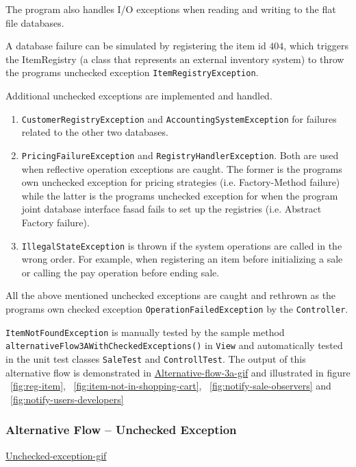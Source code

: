 \documentclass[a4paper]{scrreprt}
\begin{document}
The program also handles I/O exceptions when reading and writing to the flat file databases.

A database failure can be simulated by registering the item id $404$,
which triggers the ItemRegistry (a class that represents an external inventory system)
to throw the programs unchecked exception \texttt{ItemRegistryException}.

Additional unchecked exceptions are implemented and handled.
\begin{enumerate}
    \item \texttt{CustomerRegistryException} and \texttt{AccountingSystemException} for
    failures related to the other two databases.
    \item \texttt{PricingFailureException} and \texttt{RegistryHandlerException}.
    Both are used when reflective operation exceptions are caught.
    The former is the programs own unchecked exception for pricing strategies
    (i.e. Factory-Method failure) while the latter
    is the programs unchecked exception for
    when the program joint database interface fasad fails to set up the registries
    (i.e. Abstract Factory failure).
    \item \texttt{IllegalStateException} is thrown if the
    system operations are called in the wrong order.
    For example, when registering an item before initializing a sale
    or calling the pay operation before ending sale.
\end{enumerate}

All the above mentioned unchecked exceptions %
are caught and rethrown as the programs own checked
exception \texttt{OperationFailedException}
by the \verb|Controller|.

\texttt{ItemNotFoundException} is manually tested by the sample method
\texttt{alternativeFlow3AWithCheckedExceptions()}
in \verb|View|
and automatically tested in the unit test classes \verb|SaleTest| and \verb|ControllTest|.
The output of this alternative flow is demonstrated in
\href{https://github.com/VincentFerrigan/kth-iv1350-object-oriented-design#alternative-flow---checked-exception-business-logic}{Alternative-flow-3a-gif}
and illustrated in
figure ~\ref{fig:reg-item}, ~\ref{fig:item-not-in-shopping-cart}, ~\ref{fig:notify-sale-observers} and ~\ref{fig:notify-users-developers}

\subsubsection*{Alternative Flow -- Unchecked Exception}
\href{https://github.com/VincentFerrigan/kth-iv1350-object-oriented-design#alternative-flow---unchecked-exception}{Unchecked-exception-gif}
\end{document}
